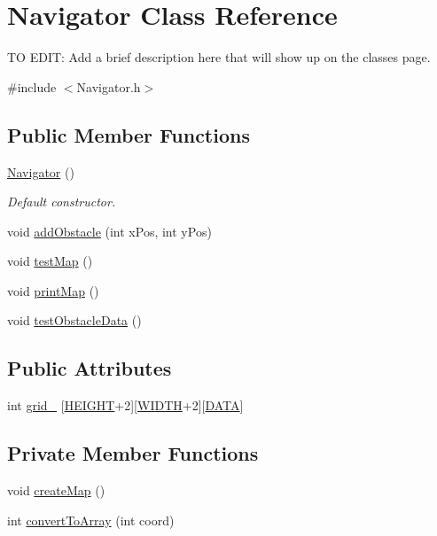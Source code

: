 \hypertarget{class_navigator}{}\section{Navigator Class Reference}
\label{class_navigator}


TO E\+D\+IT\+: Add a brief description here that will show up on the classes page.  




{\ttfamily \#include $<$Navigator.\+h$>$}

\subsection*{Public Member Functions}
\begin{DoxyCompactItemize}
\item 
\mbox{\hyperlink{class_navigator_a59230ab4698882f754d5ce275a1a4030}{Navigator}} ()
\begin{DoxyCompactList}\small\item\em Default constructor. \end{DoxyCompactList}\item 
void \mbox{\hyperlink{class_navigator_af5a35f0ae71309c1b276257709b24390}{add\+Obstacle}} (int x\+Pos, int y\+Pos)
\item 
void \mbox{\hyperlink{class_navigator_afe98283ec2d1bf0125c63eb077cc1d61}{test\+Map}} ()
\item 
void \mbox{\hyperlink{class_navigator_a2565ae0fea67cfec45a553ef0d7e06a4}{print\+Map}} ()
\item 
void \mbox{\hyperlink{class_navigator_ae31be1ae0d17e7fc78aa7c6a4553fca2}{test\+Obstacle\+Data}} ()
\end{DoxyCompactItemize}
\subsection*{Public Attributes}
\begin{DoxyCompactItemize}
\item 
int \mbox{\hyperlink{class_navigator_ad295138915accad1b15031a977f59b3e}{grid\+\_\+}} \mbox{[}\mbox{\hyperlink{_navigator_8h_af728b7647e0b8c49832983a31f9a2e9b}{H\+E\+I\+G\+HT}}+2\mbox{]}\mbox{[}\mbox{\hyperlink{_navigator_8h_a9649ab8139c4c2ea5c93625b30d92a05}{W\+I\+D\+TH}}+2\mbox{]}\mbox{[}\mbox{\hyperlink{_navigator_8h_ace45c8c944a852d4990f5f8f87b2335e}{D\+A\+TA}}\mbox{]}
\end{DoxyCompactItemize}
\subsection*{Private Member Functions}
\begin{DoxyCompactItemize}
\item 
void \mbox{\hyperlink{class_navigator_a8b0cb171e3e3b16b206278fb23f624bc}{create\+Map}} ()
\item 
int \mbox{\hyperlink{class_navigator_a7a745d33cfa5cdfc551c87f3f23dc28e}{convert\+To\+Array}} (int coord)
\end{DoxyCompactItemize}


